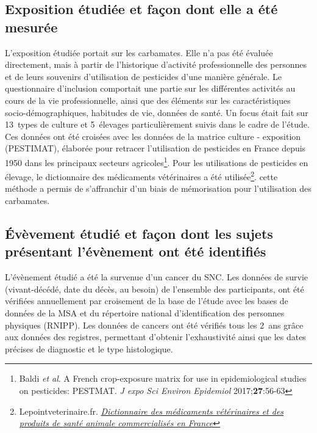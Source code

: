 \documentclass[10pt]{article}
\begin{document}
\subsection{Exposition étudiée et façon dont elle a été mesurée}
\label{exposition}
L'exposition étudiée portait sur les carbamates. Elle n'a pas été évaluée directement, mais à partir de l'historique d'activité professionnelle des personnes et de leurs souvenirs d'utilisation de pesticides d'une manière générale. Le questionnaire d'inclusion comportait une partie sur les différentes activités au cours de la vie professionnelle, ainsi que des éléments sur les caractéristiques socio-démographiques, habitudes de vie, données de santé. Un focus était fait sur 13~types de culture et 5~élevages particulièrement suivis dans le cadre de l'étude. Ces données ont été croisées avec les données de la matrice culture - exposition (PESTIMAT), élaborée pour retracer l'utilisation de pesticides en France depuis 1950 dans les principaux secteurs agricoles\footnote{Baldi \emph{et al}. A French crop-exposure matrix for use in epidemiological studies on pesticides: PESTMAT. \emph{J expo Sci Environ Epidemiol} 2017;\textbf{27}:56-63}. Pour les utilisations de pesticides en élevage, le dictionnaire des médicaments vétérinaires a été utilisée\footnote{Lepointveterinaire.fr. \emph{\href{https://www.lepointveterinaire.fr/dmv/consulter.html}{Dictionnaire des médicaments vétérinaires et des produits de santé animale commercialisés en France}}}. cette méthode a permis de s'affranchir d'un biais de mémorisation pour l'utilisation des carbamates.

\subsection{\'{E}vèvement étudié et façon dont les sujets présentant l'évènement ont été identifiés}
L'évènement étudié a été la survenue d'un cancer du SNC. Les données de survie (vivant-décédé, date du décès, au besoin) de l'ensemble des participants, ont été vérifiées annuellement par croisement de la base de l'étude avec les bases de données de la MSA et du répertoire national d'identification des personnes physiques (RNIPP). Les données de cancers ont été vérifiés tous les 2~ans grâce aux données des registres, permettant d'obtenir l'exhaustivité ainsi que les dates précises de diagnostic et le type histologique.
\end{document}
